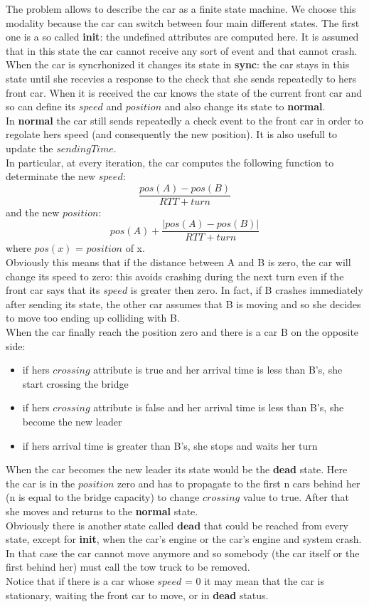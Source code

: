 The problem allows to describe the car as a finite state machine. We choose this modality because
the car can switch between four main different states. The first one is a so called \textbf{init}: the 
undefined attributes are computed here. It is assumed that in this state the car cannot receive
any sort of event and that cannot crash. \\
When the car is syncrhonized it changes its state in \textbf{sync}: the car stays in this state until she recevies
a response to the check that she sends repeatedly to hers front car. When it is received the car knows the state
of the current front car and so can define its $speed$ and $position$ and also change its state to \textbf{normal}.\\
In \textbf{normal} the car still sends repeatedly a check event to the front car in order to regolate hers speed
(and consequently the new position). It is also usefull to update the $sendingTime$.\\
In particular, at every iteration, the car computes the following function to determinate the 
new $speed$: \[\frac{pos(A)-pos(B)}{RTT + turn}\] 
and the new $position$: \[pos(A) + \frac{|pos(A)-pos(B)|}{RTT + turn}\]
where $pos(x)$ = $position$ of x. \\
Obviously this means that if the distance between A and B is zero, the car will change its speed to 
zero: this avoids crashing during the next turn even if the front car says that its $speed$ is greater
then zero. In fact, if B crashes immediately after sending its state, the other car assumes that B
is moving and so she decides to move too ending up colliding with B.\\ When the car finally reach the position
zero and there is a car B on the opposite side:
\begin{itemize}
    \item if hers $crossing$ attribute is true and her arrival time is less than B's,
     she start crossing the bridge
    \item if hers $crossing$ attribute is false and her arrival time is less than B's,
     she become the new leader
    \item if hers arrival time is greater than B's, she stops and waits her turn
\end{itemize}

When the car becomes the new leader its state would be the \textbf{dead} state. Here the car is in the $position$ zero
and has to propagate to the first n cars behind her (n is equal to the bridge capacity) 
to change $crossing$ value to true. After that she moves and returns to the \textbf{normal} state.\\
Obviously there is another state called $\textbf{dead}$ that could be reached from every state, except for \textbf{init}, 
when the car's engine or the car's engine and system crash. In that case the car cannot move anymore 
and so somebody (the car itself or the first behind her) must call the tow truck to be removed. 
\\Notice that if there is a car whose $speed$ = 0 it may mean that the car is stationary, waiting the front
 car to move, or in \textbf{dead} status.\\

